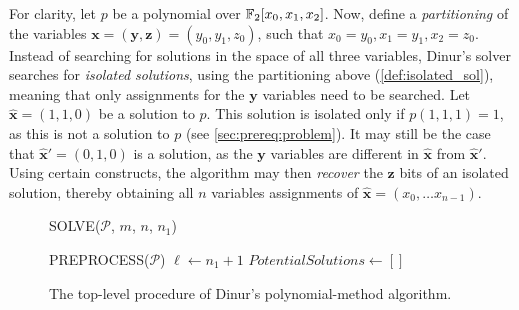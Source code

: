 For clarity, let $p$ be a polynomial over $\mathbb{F}_2[x_0,x_1,x_2]$. Now, define a \textit{partitioning} of the variables $\mathbf{x} = (\mathbf{y}, \mathbf{z}) = (y_0, y_1, z_0)$, such that $x_0 = y_0, x_1 = y_1, x_2 = z_0$. Instead of searching for solutions in the space of all three variables, Dinur's solver searches for \textit{isolated solutions}, using the partitioning above (\cref{def:isolated_sol}), meaning that only assignments for the $\mathbf{y}$ variables need to be searched. Let $\hat{\mathbf{x}} = (1,1,0)$ be a solution to $p$. This solution is isolated only if $p(1,1,1) = 1$, as this is not a solution to $p$ (see \cref{sec:prereq:problem}). It may still be the case that $\hat{\mathbf{x}}' = (0,1,0)$ is a solution, as the $\mathbf{y}$ variables are different in $\hat{\mathbf{x}}$ from $\hat{\mathbf{x}}'$. Using certain constructs, the algorithm may then \textit{recover} the $\mathbf{z}$ bits of an isolated solution, thereby obtaining all $n$ variables assignments of $\hat{\mathbf{x}} = (x_0, \dots x_{n - 1})$. 

\begin{figure}[t]
    \centering
    \begin{alg}
        \caption{SOLVE($\mathcal{P}$, $m$, $n$, $n_1$)}
        \label{alg:solve}
         \label{alg:solve:matrix}
        PREPROCESS($\mathcal{P}$)\; \label{alg:solve:preprocess}
        $\ell \gets n_1 + 1$\;
        $PotentialSolutions \gets []$\;
    \end{alg}
    \caption{The top-level procedure of Dinur's polynomial-method algorithm.}
\end{figure}

